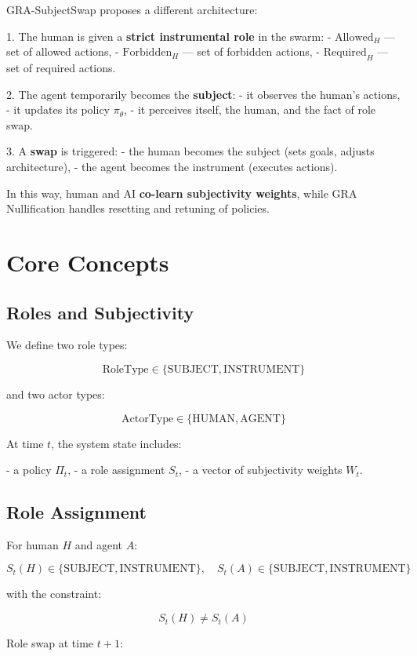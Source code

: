 \documentclass[11pt,a4paper]{article}
\begin{document}
GRA-SubjectSwap proposes a different architecture:

1. The human is given a \textbf{strict instrumental role} in the swarm:
   - \(\text{Allowed}_H\) — set of allowed actions,
   - \(\text{Forbidden}_H\) — set of forbidden actions,
   - \(\text{Required}_H\) — set of required actions.

2. The agent temporarily becomes the \textbf{subject}:
   - it observes the human's actions,
   - it updates its policy \(\pi_\theta\),
   - it perceives itself, the human, and the fact of role swap.

3. A \textbf{swap} is triggered:
   - the human becomes the subject (sets goals, adjusts architecture),
   - the agent becomes the instrument (executes actions).

In this way, human and AI \textbf{co-learn subjectivity weights}, while GRA Nullification handles resetting and retuning of policies.

\section{Core Concepts}

\subsection{Roles and Subjectivity}

We define two role types:

\[
\text{RoleType} \in \{ \text{SUBJECT}, \text{INSTRUMENT} \}
\]

and two actor types:

\[
\text{ActorType} \in \{ \text{HUMAN}, \text{AGENT} \}
\]

At time \(t\), the system state includes:

- a policy \(\Pi_t\),
- a role assignment \(S_t\),
- a vector of subjectivity weights \(W_t\).

\subsection{Role Assignment}

For human \(H\) and agent \(A\):

\[
S_t(H) \in \{ \text{SUBJECT}, \text{INSTRUMENT} \}, \quad
S_t(A) \in \{ \text{SUBJECT}, \text{INSTRUMENT} \}
\]

with the constraint:

\[
S_t(H) \neq S_t(A)
\]

Role swap at time \(t+1\):
\end{document}
